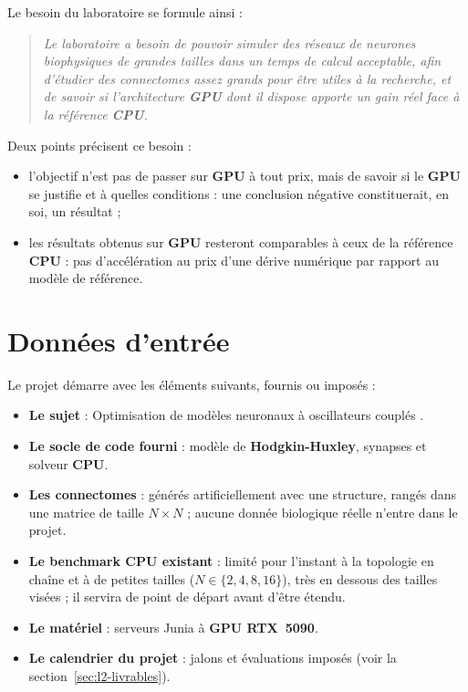 Le besoin du laboratoire se formule ainsi :

\begin{quote}
\itshape Le laboratoire a besoin de pouvoir simuler des réseaux de neurones biophysiques de grandes tailles  dans un temps de calcul acceptable, afin d'étudier des connectomes assez grands pour être utiles à la recherche, et de savoir si l'architecture \textbf{GPU} dont il dispose apporte un gain réel face à la référence \textbf{CPU}.
\end{quote}

Deux points précisent ce besoin :
\begin{itemize}
    \item l'objectif n'est pas de passer sur \textbf{GPU} à tout prix, mais de savoir si le \textbf{GPU} se justifie et à quelles conditions : une conclusion négative constituerait, en soi, un résultat ;
    \item les résultats obtenus sur \textbf{GPU} resteront comparables à ceux de la référence \textbf{CPU} : pas d'accélération au prix d'une dérive numérique par rapport au modèle de référence.
\end{itemize}

\section{Données d'entrée}

Le projet démarre avec les éléments suivants, fournis ou imposés :

\begin{itemize}
    \item \textbf{Le sujet} : \og Optimisation de modèles neuronaux à oscillateurs couplés \fg{}.
    \item \textbf{Le socle de code fourni} : modèle de \textbf{Hodgkin-Huxley}, synapses et solveur \textbf{CPU}.
    \item \textbf{Les connectomes} : générés artificiellement avec une structure, rangés dans une matrice de taille $N \times N$ ; aucune donnée biologique réelle n'entre dans le projet.
    \item \textbf{Le benchmark CPU existant} : limité pour l'instant à la topologie en chaîne et à de petites tailles ($N \in \{2, 4, 8, 16\}$), très en dessous des tailles visées ; il servira de point de départ avant d'être étendu.
    \item \textbf{Le matériel} : serveurs Junia à \textbf{GPU RTX~5090}.
    \item \textbf{Le calendrier du projet} : jalons et évaluations imposés (voir la section~\ref{sec:l2-livrables}).
\end{itemize}

